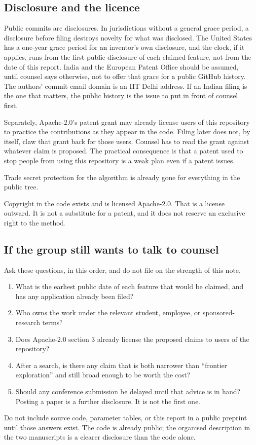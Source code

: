 \documentclass[11pt]{article}
\begin{document}
\subsection{Disclosure and the licence}
Public commits are disclosures. In jurisdictions without a general grace period, a disclosure before filing destroys novelty for what was disclosed. The United States has a one-year grace period for an inventor's own disclosure, and the clock, if it applies, runs from the first public disclosure of each claimed feature, not from the date of this report. India and the European Patent Office should be assumed, until counsel says otherwise, not to offer that grace for a public GitHub history. The authors' commit email domain is an IIT Delhi address. If an Indian filing is the one that matters, the public history is the issue to put in front of counsel first.

Separately, Apache-2.0's patent grant may already license users of this repository to practice the contributions as they appear in the code. Filing later does not, by itself, claw that grant back for those users. Counsel has to read the grant against whatever claim is proposed. The practical consequence is that a patent used to stop people from using this repository is a weak plan even if a patent issues.

Trade secret protection for the algorithm is already gone for everything in the public tree.

Copyright in the code exists and is licensed Apache-2.0. That is a license outward. It is not a substitute for a patent, and it does not reserve an exclusive right to the method.

\subsection{If the group still wants to talk to counsel}
Ask these questions, in this order, and do not file on the strength of this note.
\begin{enumerate}
\item What is the earliest public date of each feature that would be claimed, and has any application already been filed?
\item Who owns the work under the relevant student, employee, or sponsored-research terms?
\item Does Apache-2.0 section 3 already license the proposed claims to users of the repository?
\item After a search, is there any claim that is both narrower than ``frontier exploration'' and still broad enough to be worth the cost?
\item Should any conference submission be delayed until that advice is in hand? Posting a paper is a further disclosure. It is not the first one.
\end{enumerate}
Do not include source code, parameter tables, or this report in a public preprint until those answers exist. The code is already public; the organised description in the two manuscripts is a clearer disclosure than the code alone.
\end{document}
